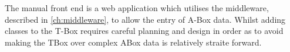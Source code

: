 The manual front end is a web application which utilises the middleware, described in \autoref{ch:middleware}, to allow the entry of A-Box data. Whilst adding classes to the T-Box requires careful planning and design in order as to avoid making the TBox over complex ABox data is relatively straite forward. 